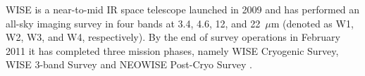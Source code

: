 \documentclass[numberedappendix,apj,twocolumn]{emulateapj}
\begin{document}



WISE \citep{Wright2010} is a near-to-mid IR space telescope launched in 2009 and has performed an all-sky imaging survey in four bands at 3.4, 4.6, 12, and 22~$\mu$m (denoted as W1, W2, W3, and W4, respectively). By the end of survey operations in February 2011 it has completed three mission phases, namely WISE Cryogenic Survey, WISE 3-band Survey and NEOWISE Post-Cryo Survey \citep{2011ApJ...731...53M}.


\end{document}
